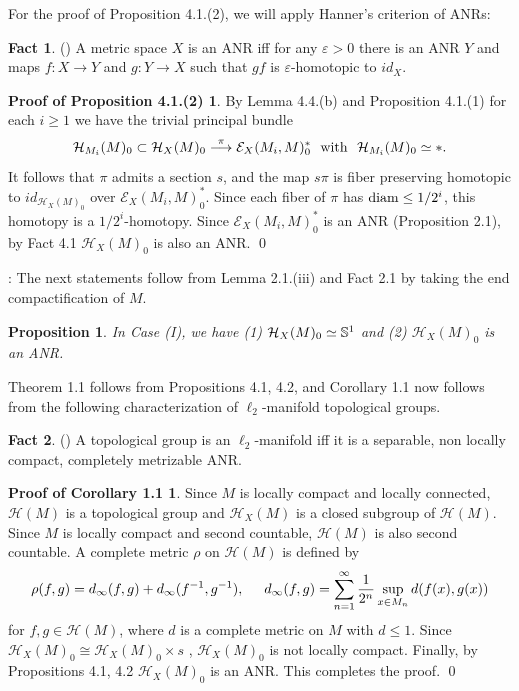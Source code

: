 \documentclass[11pt]{amsart}
\newtheorem{proposition}{Proposition}[section]
\theoremstyle{definition}
\newtheorem{fact}{Fact}[section]
\newtheorem*{Proof of Theorem 3.1}{Proof of Theorem 3.1}
\newtheorem*{Proof of Corollary 3.1}{Proof of Corollary 3.1}
\newtheorem*{Proof of Proposition 4.1.(1)}{Proof of Proposition 4.1.(1)}
\newtheorem*{Proof of Proposition 4.1.(2)}{Proof of Proposition 4.1.(2)}
\newtheorem*{Proof of Corollary 1.1}{Proof of Corollary 1.1}
\def \cal {\mathcal}
\begin{document}
For the proof of Proposition 4.1.(2), we will apply Hanner's criterion of ANRs: 

\begin{fact} (\cite{Han}) 
A metric space $X$ is an ANR iff for any $\varepsilon > 0$ there is an ANR $Y$ and maps $f : X \to Y$ and $g : Y \to X$ such that $gf$ is $\varepsilon$-homotopic to $id_X$. 
\end{fact}

\begin{Proof of Proposition 4.1.(2)} 
By Lemma 4.4.(b) and Proposition 4.1.(1) for each $i \geq 1$ we have the trivial principal bundle
\[ {\cal H}_{M_i}(M)_0 \subset {\cal H}_X(M)_0 \stackrel{\pi}{\longrightarrow} {\cal E}_X(M_i, M)^{\ast}_0 \ \ {\rm with} \ \ {\cal H}_{M_i}(M)_0 \simeq \ast. \]
It follows that $\pi$ admits a section $s$, and the map $s \pi$ is fiber preserving homotopic to $id_{{\cal H}_X(M)_0}$ over ${\cal E}_X(M_i, M)^{\ast}_0$. Since each fiber of $\pi$ has ${\rm diam} \leq 1/2^i$, this homotopy is a $1/2^i$-homotopy. Since ${\cal E}_X(M_i, M)^{\ast}_0$ is an ANR (Proposition 2.1), by Fact 4.1 ${\cal H}_X(M)_0$ is also an ANR. \qed
\end{Proof of Proposition 4.1.(2)} 

: The next statements follow from Lemma 2.1.(iii) and Fact 2.1 by taking the end compactification of $M$. 

\begin{proposition}
In Case {\rm (I)}, we have {\rm (1)} ${\cal H}_X(M)_0 \simeq {\Bbb S}^1$ and {\rm (2)} ${\cal H}_X(M)_0$ is an ANR.
\end{proposition}

Theorem 1.1 follows from Propositions 4.1, 4.2, and Corollary 1.1 now follows from the following characterization of $\ell_2$-manifold topological groups.

\begin{fact} (\cite{DT})
A topological group is an $\ell_2$-manifold iff it is a separable, non locally compact, completely metrizable ANR. 
\end{fact}

\begin{Proof of Corollary 1.1} Since $M$ is locally compact and locally connected, ${\mathcal H}(M)$ is a topological group and ${\mathcal H}_X(M)$ is a closed subgroup of ${\mathcal H}(M)$. Since $M$ is locally compact and second countable, ${\mathcal H}(M)$ is also second countable. A complete metric $\rho$ on ${\cal H}(M)$ is defined by 
\[ \rho(f, g) = d_{\infty}(f, g) + d_{\infty}(f^{-1}, g^{-1}), \hspace{0.5cm} d_{\infty}(f, g) = \sum_{n = 1}^{\infty} \frac{1}{2^n} \sup_{x \in M_n} d(f(x), g(x)) \]
for $f, g \in {\mathcal H}(M)$, where $d$ is a complete metric on $M$ with $d \leq 1$. Since ${\mathcal H}_X(M)_0 \cong {\mathcal H}_X(M)_0 \times s$ \cite{Ge}, ${\mathcal H}_X(M)_0$ is not locally compact. Finally, by Propositions 4.1, 4.2 ${\mathcal H}_X(M)_0$ is an ANR. This completes the proof. \qed
\end{Proof of Corollary 1.1} 
\end{document}
